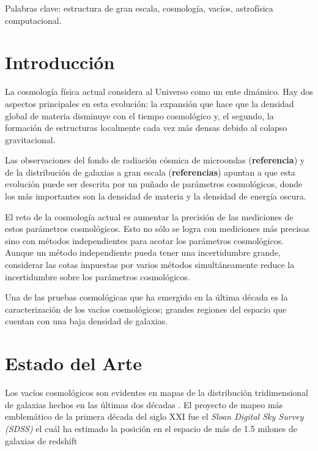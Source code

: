 \documentclass[preprint]{aastex62}
\begin{document}
  \medskip

  Palabras clave: estructura de gran escala, cosmología, vacíos,
  astrofísica computacional.


  \section{Introducción}

  La cosmolog\'ia f\'isica actual considera al Universo como un ente
  dinámico.  
  Hay dos aspectos principales en esta evoluci\'on: la expansi\'on que
  hace que la densidad global de materia disminuye
  con el tiempo cosmol\'ogico y, el segundo, la formaci\'on de
  estructuras localmente cada vez m\'as densas debido al colapso
  gravitacional. 

  Las observaciones del fondo de radiaci\'on c\'osmica de microondas
  ({\bf referencia}) y de la distribuci\'on de galaxias a gran escala
  ({\bf referencias}) apuntan a que esta evoluci\'on puede ser descrita
  por un pu\~nado de par\'ametros cosmol\'ogicos, donde los m\'as
  importantes son la densidad de materia y la densidad de energ\'ia
  oscura. 
  
  El reto de la cosmolog\'ia actual
 es aumentar la precisi\'on de las
  mediciones de estos par\'ametros cosmol\'ogicos. 
  Esto no s\'olo se logra con mediciones m\'as precisas sino con
  m\'etodos independientes para acotar los par\'ametros
  cosmol\'ogicos.
  Aunque un m\'etodo independiente pueda tener una incertidumbre
  grande, considerar las cotas impuestas por varios m\'etodos
  simult\'aneamente reduce la incertidumbre sobre los par\'ametros
  cosmol\'ogicos.

  Una de las pruebas cosmol\'ogicas que ha emergido en la \'ultima
  d\'ecada es la caracterizaci\'on de los vac\'ios cosmol\'ogicos;
  grandes regiones del espacio que cuentan con una baja densidad de
  galaxias. 

  

  \section{Estado del Arte}

Los vac\'ios cosmol\'ogicos son evidentes en mapas de la
distribuci\'on tridimensional de galaxias hechos en las \'ultimas dos
d\'ecadas \citep{SDSS-DR14-2017}.
El proyecto de mapeo más emblem\'atico de la primera década del
siglo XXI fue el \textit{Sloan Digital Sky Survey (SDSS)} el cu\'al
ha estimado la posici\'on en el espacio de más de 1.5 milones de galaxias de redshift
\end{document}
